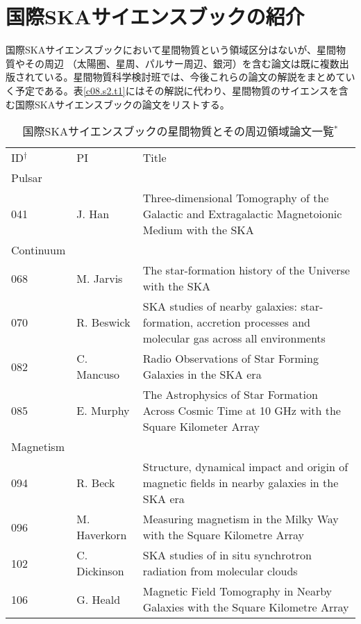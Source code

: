 \setcounter{section}{1}\section{国際SKAサイエンスブックの紹介}
\label{c08.s2}

国際SKAサイエンスブックにおいて星間物質という領域区分はないが、星間物質やその周辺
（太陽圏、星周、パルサー周辺、銀河）を含む論文は既に複数出版されている。星間物質科学検討班では、今後これらの論文の解説をまとめていく予定である。表\ref{c08.s2.t1}にはその解説に代わり、星間物質のサイエンスを含む国際SKAサイエンスブックの論文をリストする。

\begin{table}
\caption{国際SKAサイエンスブックの星間物質とその周辺領域論文一覧$^*$}
\begin{center}
\small
\begin{tabular}{llp{}}
\hline\hline
\noalign{\smallskip}
ID$^\dag$ & PI & Title\\
\noalign{\smallskip}
\hline
\noalign{\smallskip}
Pulsar &&\\
041 & J. Han  & Three-dimensional Tomography of the Galactic and Extragalactic Magnetoionic Medium with the SKA \\
\noalign{\smallskip}
\hline
\noalign{\smallskip}
Continuum &&\\
068 & M. Jarvis  & The star-formation history of the Universe with the SKA\\
070 & R. Beswick  & SKA studies of nearby galaxies: star-formation, accretion processes and molecular gas across all environments\\
082 & C. Mancuso  & Radio Observations of Star Forming Galaxies in the SKA era\\
085 & E. Murphy  & The Astrophysics of Star Formation Across Cosmic Time at 10 GHz with the Square Kilometer Array\\
\noalign{\smallskip}
\hline
\noalign{\smallskip}
Magnetism &&\\
094 & R. Beck  & Structure, dynamical impact and origin of magnetic fields in nearby galaxies in the SKA era\\
096 & M. Haverkorn  & Measuring magnetism in the Milky Way with the Square Kilometre Array\\
102 & C. Dickinson  & SKA studies of in situ synchrotron radiation from molecular clouds\\
106 & G. Heald  & Magnetic Field Tomography in Nearby Galaxies with the Square Kilometre Array\\

\end{tabular}
\end{center}
\end{table}
